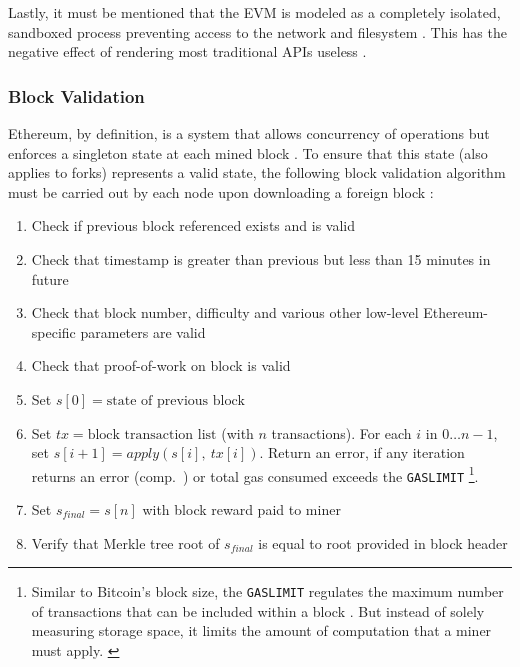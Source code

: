 Lastly, it must be mentioned that the \ac{EVM} is modeled as a completely isolated, sandboxed process preventing access to the network and filesystem \cite[p.~19]{solidityDocs}. This has the negative effect of rendering most traditional APIs useless \cite[p.~46]{Raval.2016}. 


%

\subsubsection{Block Validation}
Ethereum, by definition, is a system that allows concurrency of operations but enforces a singleton state at each mined block \cite[p.~151]{Antonopoulos.2018}. To ensure that this state (also applies to forks) represents a valid state, the following block validation algorithm must be carried out by each node upon downloading a foreign block \cite[p.~57]{Antonopoulos.2018} \cite[pp.~23]{ethereumWhitepaperGitHub}:

\begin{enumerate}
  \item Check if previous block referenced exists and is valid
  \item Check that timestamp is greater than previous but less than 15 minutes in future
  \item Check that block number, difficulty and various other low-level Ethereum-specific parameters are valid
  \item Check that proof-of-work on block is valid
  \item Set $s[0] = \text{state of previous block}$ 
  \item Set $tx = \text{block transaction list}$  (with $n$ transactions). For each $i$ in $0 \dots n-1$, set $s[i+1] = apply(s[i],\ tx[i])$. Return an error, if any iteration returns an error (comp.~) or total gas consumed exceeds the \texttt{GASLIMIT} \footnote{Similar to Bitcoin's block size, the \texttt{GASLIMIT} regulates the maximum number of transactions that can be included within a block \cite{blocksizeControversy} \cite[p.~8]{ethereumYellowPaper}. But instead of solely measuring storage space, it limits the amount of computation that a miner must apply. \label{ftn:gasLimit}}.
  \item Set $s_{final} = s[n]$ with block reward paid to miner
  \item Verify that Merkle tree root of $s_{final}$ is equal to root provided in block header
\end{enumerate}


